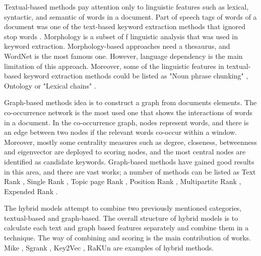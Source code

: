 \documentclass[3p]{elsarticle}
\begin{document}
Textual-based methods pay attention only to linguistic features such as lexical, syntactic, and semantic of words in a document. Part of speech tags of words of a document was one of the text-based keyword extraction methods that ignored stop words \cite{10.3115/1119355.1119383}. Morphology is a subset of f linguistic analysis that was used in keyword extraction. Morphology-based approaches \cite{li2015keyphrase} need a thesaurus, and WordNet \cite{miller1998wordnet} is the most famous one. However, language dependency is the main limitation of this approach. Moreover, some of the linguistic features in textual-based keyword extraction methods could be listed as "Noun phrase chunking" \cite{hulth2003improved}, Ontology \cite{shamsfard2008} or "Lexical chains" \cite{enss2006investigation}.

Graph-based methods idea is to construct a graph from documents elements. The co-occurrence network is the most used one that shows the interactions of words in a document. In the co-occurrence graph, nodes represent words, and there is an edge between two nodes if the relevant words co-occur within a window. Moreover, mostly some centrality measures such as degree, closeness, betweenness and eigenvector are deployed to scoring nodes, and the most central nodes are identified as candidate keywords. Graph-based methods have gained good results in this area, and there are vast works; a number of methods can be listed as Text Rank \cite{Mihalcea2004}, Single Rank \cite{Wan2008}, Topic page Rank \cite{Sterckx2015}, Position Rank \cite{Florescu2017}, Multipartite Rank \cite{Boudin2018}, Expended Rank \cite{Wan2008}.

The hybrid models attempt to combine two previously mentioned categories, textual-based and graph-based. The overall structure of hybrid models is to calculate each text and graph based features separately and combine them in a technique. The way of combining and scoring is the main contribution of works. Mike \cite{10.1145/3132847.3132956}, Sgrank \cite{sgrank-2015}, Key2Vec \cite{mahata-key2vec}, RaKUn \cite{rakun2019} are examples of hybrid methods.
\end{document}
